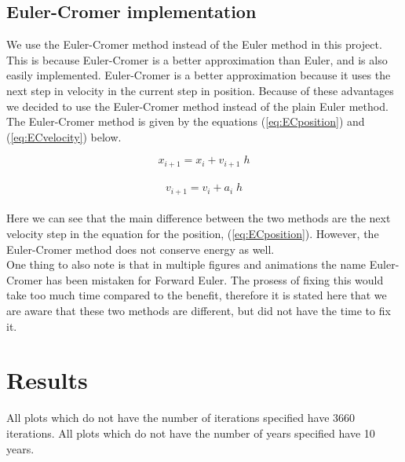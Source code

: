 \documentclass{article}
\begin{document}
\subsection{Euler-Cromer implementation}    \label{sec:eulercromer}

    We use the Euler-Cromer method instead of the Euler method in this project. This is because Euler-Cromer is a better approximation than Euler, and is also easily implemented. Euler-Cromer is a better approximation because it uses the next step in velocity in the current step in position. Because of these advantages we decided to use the Euler-Cromer method instead of the plain Euler method. The Euler-Cromer method is given by the equations (\ref{eq:ECposition}) and (\ref{eq:ECvelocity}) below.

    \begin{equation}    \label{eq:ECposition}
        x_{i+1} = x_i + v_{i+1} \; h
    \end{equation} \\

    \begin{equation}    \label{eq:ECvelocity}
        v_{i+1} = v_i + a_i \; h
    \end{equation} \\

    Here we can see that the main difference between the two methods are the next velocity step in the equation for the position, (\ref{eq:ECposition}). However, the Euler-Cromer method does not conserve energy as well. \\

    One thing to also note is that in multiple figures and animations the name Euler-Cromer has been mistaken for Forward Euler. The prosess of fixing this would take too much time compared to the benefit, therefore it is stated here that we are aware that these two methods are different, but did not have the time to fix it. \\



\vspace{1cm}

\section{Results} \label{sec:Results}

    All plots which do not have the number of iterations specified have 3660 iterations. All plots which do not have the number of years specified have 10 years. \\
\end{document}
